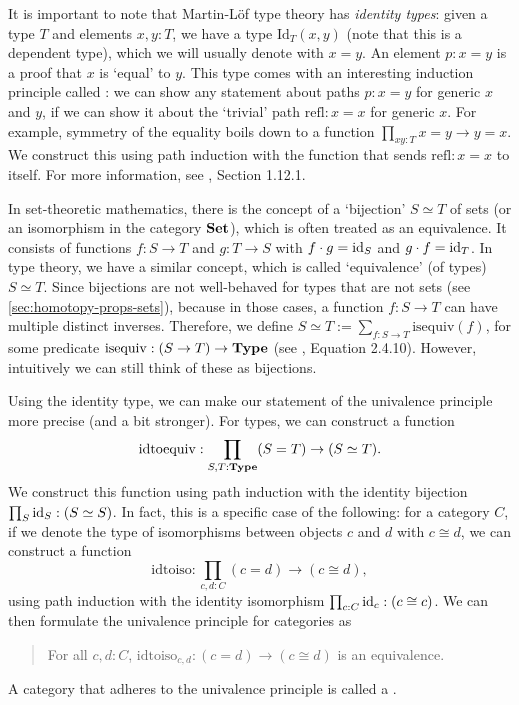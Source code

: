 It is important to note that Martin-Löf type theory has \textit{identity types}: given a type $ T $ and elements $ x, y: T $, we have a type $ \mathrm{Id}_T(x, y) $ (note that this is a dependent type), which we will usually denote with $ x = y $. An element $ p: x = y $ is a proof that $ x $ is `equal' to $ y $. This type comes with an interesting induction principle called : we can show any statement about paths $ p: x = y $ for generic $ x $ and $ y $, if we can show it about the `trivial' path $ \mathrm{refl}: x = x $ for generic $ x $. For example, symmetry of the equality boils down to a function $ \prod_{x y : T} x = y \to y = x $. We construct this using path induction with the function that sends $ \mathrm{refl}: x = x $ to itself. For more information, see \cite{hottbook}, Section 1.12.1.

In set-theoretic mathematics, there is the concept of a `bijection' $ S \simeq T $ of sets (or an isomorphism in the category $ \mathbf{Set} $), which is often treated as an equivalence. It consists of functions $ f: S \to T $ and $ g: T \to S $ with $ f \cdot g = \text{id}_{S} $ and $ g \cdot f = \text{id}_{T} $. In type theory, we have a similar concept, which is called `equivalence' (of types) $ S \simeq T $. Since bijections are not well-behaved for types that are not sets (see \ref{sec:homotopy-props-sets}), because in those cases, a function $ f: S \to T $ can have multiple distinct inverses. Therefore, we define $ S \simeq T := \sum_{f: S \to T} \mathrm{isequiv}(f) $, for some predicate $ \mathrm{isequiv}: (S \to T) \to \mathbf{Type} $ (see \cite{hottbook}, Equation 2.4.10). However, intuitively we can still think of these as bijections.

Using the identity type, we can make our statement of the univalence principle more precise (and a bit stronger). For types, we can construct a function
\[ \mathrm{idtoequiv}: \prod_{S, T: \mathbf{Type}} (S = T) \to (S \simeq T). \]
We construct this function using path induction with the identity bijection $ \prod_S \text{id}_{S}: (S \simeq S) $. In fact, this is a specific case of the following: for a category $ C $, if we denote the type of isomorphisms between objects $ c $ and $ d $ with $ c \cong d $, we can construct a function
\[ \mathrm{idtoiso}: \prod_{c, d: C} (c = d) \to (c \cong d), \]
using path induction with the identity isomorphism $ \prod_{c: C} \text{id}_{c}: (c \cong c) $. We can then formulate the univalence principle for categories as
\begin{quote}
  For all $ c, d : C $, $ \mathrm{idtoiso}_{c, d}: (c = d) \to (c \cong d) $ is an equivalence.
\end{quote}
A category that adheres to the univalence principle is called a .

